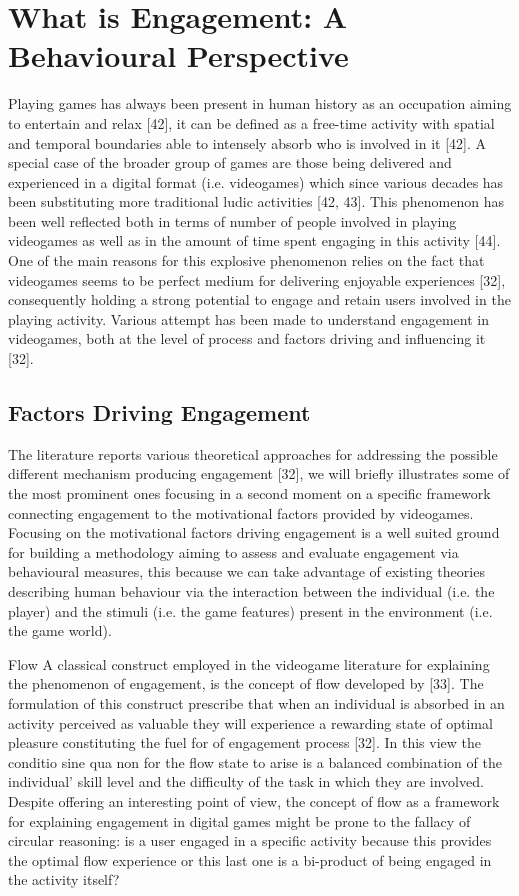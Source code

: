 \section{What is Engagement: A Behavioural Perspective}
\label{engagement}
Playing games has always been present in human history as an occupation aiming to entertain and relax [42], it can be defined as a free-time activity with spatial and temporal boundaries able to intensely absorb who is involved in it [42]. A special case of the broader group of games are those being delivered and experienced in a digital format (i.e. videogames) which since various decades has been substituting more traditional ludic activities [42, 43]. This phenomenon has been well reflected both in terms of number of people involved in playing videogames as well as in the amount of time spent engaging in this activity [44]. One of the main reasons for this explosive phenomenon relies on the fact that videogames seems to be perfect medium for delivering enjoyable experiences [32], consequently holding a strong potential to engage and retain users involved in the playing activity. Various attempt has been made to understand engagement in videogames, both at the level of process and factors driving and influencing it [32].

\subsection{Factors Driving Engagement}
\label{factors_engagement}
The literature reports various theoretical approaches  for addressing the possible different mechanism producing engagement [32], we will briefly illustrates some of the most prominent ones focusing in a second moment on a specific framework connecting engagement to the motivational factors provided by videogames. Focusing on the motivational factors driving engagement is a well suited ground for building a methodology aiming to assess and evaluate engagement via behavioural measures, this because we can take advantage of existing theories describing human behaviour via the interaction between the individual (i.e. the player) and the stimuli (i.e. the game features) present in the environment (i.e. the game world).

Flow
A classical construct employed in the videogame literature for explaining the phenomenon of engagement, is the concept of flow developed by [33]. The formulation of this construct prescribe that when an individual is absorbed in an activity perceived as valuable they will experience a rewarding state of optimal pleasure constituting the fuel for of  engagement process [32]. In this view the conditio sine qua non for the flow state to arise is a balanced combination of the individual’ skill level and the difficulty of the task in which they are involved. Despite offering an interesting point of view, the concept of flow as a framework for explaining engagement in digital games might be prone to the fallacy of circular reasoning: is a user engaged in a specific activity because this provides the optimal flow experience or this last one is a bi-product of being engaged in the activity itself? 

